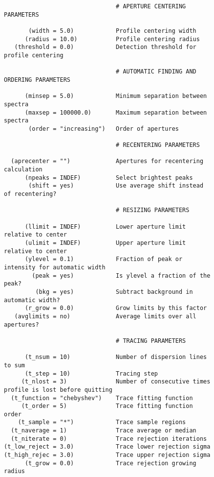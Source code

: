 \begin{figure}
{\begin{verbatim}
                                # APERTURE CENTERING PARAMETERS
                                
       (width = 5.0)            Profile centering width
      (radius = 10.0)           Profile centering radius
   (threshold = 0.0)            Detection threshold for profile centering
                                
                                # AUTOMATIC FINDING AND ORDERING PARAMETERS
                                
      (minsep = 5.0)            Minimum separation between spectra
      (maxsep = 100000.0)       Maximum separation between spectra
       (order = "increasing")   Order of apertures
                                
                                # RECENTERING PARAMETERS
                                
  (aprecenter = "")             Apertures for recentering calculation
      (npeaks = INDEF)          Select brightest peaks
       (shift = yes)            Use average shift instead of recentering?
                                
                                # RESIZING PARAMETERS
                                
      (llimit = INDEF)          Lower aperture limit relative to center
      (ulimit = INDEF)          Upper aperture limit relative to center
      (ylevel = 0.1)            Fraction of peak or intensity for automatic width
        (peak = yes)            Is ylevel a fraction of the peak?
         (bkg = yes)            Subtract background in automatic width?
      (r_grow = 0.0)            Grow limits by this factor
   (avglimits = no)             Average limits over all apertures?
                                
                                # TRACING PARAMETERS
                                
      (t_nsum = 10)             Number of dispersion lines to sum
      (t_step = 10)             Tracing step
     (t_nlost = 3)              Number of consecutive times profile is lost before quitting
  (t_function = "chebyshev")    Trace fitting function
     (t_order = 5)              Trace fitting function order
    (t_sample = "*")            Trace sample regions
  (t_naverage = 1)              Trace average or median
  (t_niterate = 0)              Trace rejection iterations
(t_low_reject = 3.0)            Trace lower rejection sigma
(t_high_rejec = 3.0)            Trace upper rejection sigma
      (t_grow = 0.0)            Trace rejection growing radius
                                

\end{verbatim}}
\end{figure}
